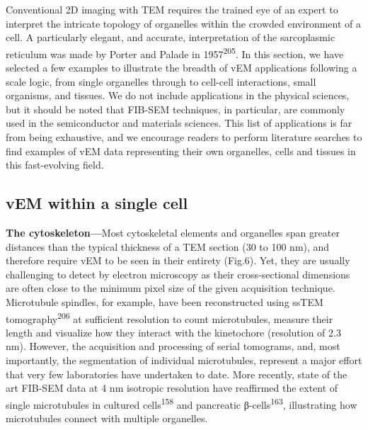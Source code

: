 \documentclass{article}
\begin{document}
Conventional 2D imaging with TEM requires the trained eye of an expert to interpret the intricate topology of organelles within the crowded environment of a cell. A particularly elegant, and accurate, interpretation of the sarcoplasmic reticulum was made by Porter and Palade in 1957\textsuperscript{205}. In this section, we have selected a few examples to illustrate the breadth of vEM applications following a scale logic, from single organelles through to cell-cell interactions, small organisms, and tissues. We do not include applications in the physical sciences, but it should be noted that FIB-SEM techniques, in particular, are commonly used in the semiconductor and materials sciences. This list of applications is far from being exhaustive, and we encourage readers to perform literature searches to find examples of vEM data representing their own organelles, cells and tissues in this fast-evolving field.

\subsection*{vEM within a single cell}

\textbf{The cytoskeleton—}Most cytoskeletal elements and organelles span greater distances than the typical thickness of a TEM section (30 to 100 nm), and therefore require vEM to be seen in their entirety (Fig.6). Yet, they are usually challenging to detect by electron microscopy as their cross-sectional dimensions are often close to the minimum pixel size of the given acquisition technique. Microtubule spindles, for example, have been reconstructed using ssTEM tomography\textsuperscript{206} at sufficient resolution to count microtubules, measure their length and visualize how they interact with the kinetochore (resolution of 2.3 nm). However, the acquisition and processing of serial tomograms, and, most importantly, the segmentation of individual microtubules, represent a major effort that very few laboratories have undertaken to date. More recently, state of the art FIB-SEM data at 4 nm isotropic resolution have reaffirmed the extent of single microtubules in cultured cells\textsuperscript{158} and pancreatic β-cells\textsuperscript{163}, illustrating how microtubules connect with multiple organelles.
\end{document}
